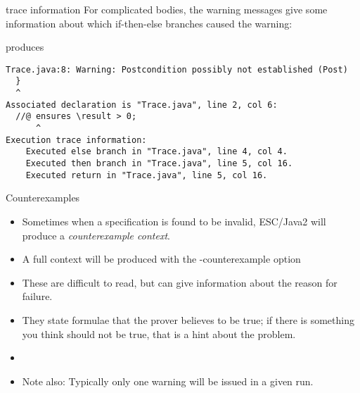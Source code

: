 \documentclass[
pdf,
nocolorBG,
slideColor,
cok,
]{prosper}
\newcommand{\bsl}{\char'134}
\newcommand{\result}{\bsl result}
\begin{document}
\begin{slide}{trace information}
\vspace*{-9ex}
For complicated bodies, the warning messages give some information about which
if-then-else branches caused the warning:
\begin{figure*}
\tiny

\end{figure*}
\vspace*{-2ex}
produces
\tiny
\begin{verbatim}
Trace.java:8: Warning: Postcondition possibly not established (Post)
  }
  ^
Associated declaration is "Trace.java", line 2, col 6:
  //@ ensures \result > 0;
      ^
Execution trace information:
    Executed else branch in "Trace.java", line 4, col 4.
    Executed then branch in "Trace.java", line 5, col 16.
    Executed return in "Trace.java", line 5, col 16.
\end{verbatim}
\end{slide}

\begin{slide}{Counterexamples}
\vspace*{-6ex}
\begin{itemize}
\item Sometimes when a specification is found to be invalid, ESC/Java2 will produce a 
{\it counterexample context}.
\item A full context will be produced with the {\knalblue -counterexample} option
\item These are difficult to read, but can give information about the reason for failure.
\item They state formulae that the prover believes to be true; if there is something you think should
not be true, that is a hint about the problem.
\item[]
\item Note also: Typically only one warning will be issued in a given run.
\end{itemize}
\end{slide}

\end{document}
